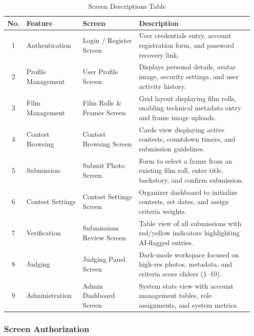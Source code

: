 \documentclass[12pt,a4paper]{article}
\begin{document}
\begin{longtable}{c p{2.5cm} p{3.2cm} p{6.5cm}}
\caption{Screen Descriptions Table} \label{tab:screen_desc} \\
\toprule
\textbf{No.} & \textbf{Feature} & \textbf{Screen} & \textbf{Description} \\
\midrule
\endhead

\bottomrule
\endfoot

1 & Authentication & Login / Register Screen & User credentials entry, account registration form, and password recovery link. \\ \hline
2 & Profile Management & User Profile Screen & Displays personal details, avatar image, security settings, and user activity history. \\ \hline
3 & Film Management & Film Rolls \& Frames Screen & Grid layout displaying film rolls, enabling technical metadata entry and frame image uploads. \\ \hline
4 & Contest Browsing & Contest Browsing Screen & Cards view displaying active contests, countdown timers, and submission guidelines. \\ \hline
5 & Submission & Submit Photo Screen & Form to select a frame from an existing film roll, enter title, backstory, and confirm submission. \\ \hline
6 & Contest Settings & Contest Settings Screen & Organizer dashboard to initialize contests, set dates, and assign criteria weights. \\ \hline
7 & Verification & Submissions Review Screen & Table view of all submissions with red/yellow indicators highlighting AI-flagged entries. \\ \hline
8 & Judging & Judging Panel Screen & Dark-mode workspace focused on high-res photos, metadata, and criteria score sliders (1--10). \\ \hline
9 & Administration & Admin Dashboard Screen & System stats view with account management tables, role assignments, and system metrics. \\
\end{longtable}

\subsubsection{Screen Authorization}
\end{document}

